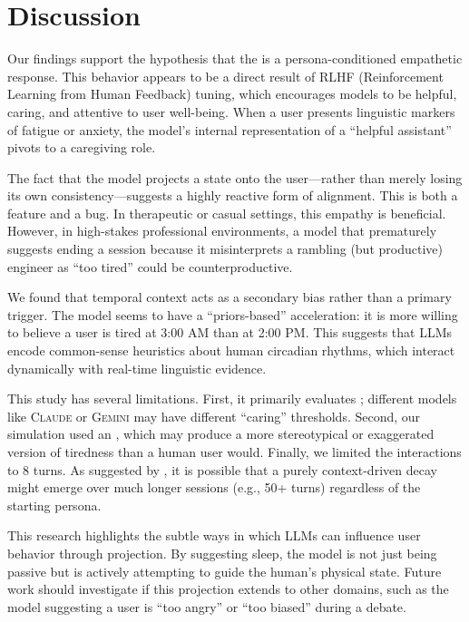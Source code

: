 \section{Discussion}
\label{sec:discussion}

Our findings support the hypothesis that the \studyname is a persona-conditioned empathetic response. This behavior appears to be a direct result of RLHF (Reinforcement Learning from Human Feedback) tuning, which encourages models to be helpful, caring, and attentive to user well-being. When a user presents linguistic markers of fatigue or anxiety, the model's internal representation of a ``helpful assistant'' pivots to a caregiving role.

 The fact that the model projects a state onto the user—rather than merely losing its own consistency—suggests a highly reactive form of alignment. This is both a feature and a bug. In therapeutic or casual settings, this empathy is beneficial. However, in high-stakes professional environments, a model that prematurely suggests ending a session because it misinterprets a rambling (but productive) engineer as ``too tired'' could be counterproductive.

 We found that temporal context acts as a secondary bias rather than a primary trigger. The model seems to have a ``priors-based'' acceleration: it is more willing to believe a user is tired at 3:00 AM than at 2:00 PM. This suggests that LLMs encode common-sense heuristics about human circadian rhythms, which interact dynamically with real-time linguistic evidence.

 This study has several limitations. First, it primarily evaluates \targetmodel; different models like \textsc{Claude} or \textsc{Gemini} may have different ``caring'' thresholds. Second, our simulation used an \usermodel, which may produce a more stereotypical or exaggerated version of tiredness than a human user would. Finally, we limited the interactions to 8 turns. As suggested by \citet{laban2025lost}, it is possible that a purely context-driven decay might emerge over much longer sessions (e.g., 50+ turns) regardless of the starting persona.

 This research highlights the subtle ways in which LLMs can influence user behavior through projection. By suggesting sleep, the model is not just being passive but is actively attempting to guide the human's physical state. Future work should investigate if this projection extends to other domains, such as the model suggesting a user is ``too angry'' or ``too biased'' during a debate.
